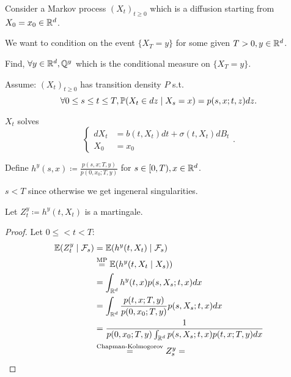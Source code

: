 Consider a Markov process $(X_t)_{t\geq 0}$ which is a 
diffusion starting from $X_0=x_0\in\mathbb{R}^d$. %

We want to condition on the event $\{X_T=y\}$ for some given $T>0,y\in\mathbb{R}^d$.

 Find, $\forall y\in \mathbb{R}^d, \mathbb{Q}^y$ which is the conditional measure on $\{X_T=y\}$.

Assume: $(X_t)_{t\geq 0}$ has transition density $P$ s.t. 
\[\forall 0\leq s\leq t\leq T,\mathbb{P}(X_t\in dz\mid X_s=x)=p(s,x;t,z)dz.\]

$X_t$ solves \[\begin{cases}dX_t &= b(t,X_t)dt+\sigma(t,X_t)dB_t\\
    X_0&=x_0
\end{cases}.\]

Define $h^y(s,x)\coloneqq \frac{p(s,x;T,y)}{p(0,x_0;T,y)}$ for $s\in [0,T),x\in\mathbb{R}^d$.

\begin{remark}
    $s<T$ since otherwise we get ingeneral singularities.
\end{remark}

\begin{lemma}\label{lem:2.4}
    Let $Z_t^y\coloneqq h^y(t,X_t)$ is a martingale. 
\end{lemma}

\begin{proof}
    Let $0\leq <t<T$:
    \begin{align*}
        \mathbb{E}(Z_t^y\mid\mathcal{F}_s)&=\mathbb{E}(h^y(t,X_t)\mid \mathcal{F}_s)\\
        &\stackrel{\text{MP}}{=}\mathbb{E}(h^y(t,X_t\mid X_s))\\
        &=\int_{\mathbb{R}^d} h^y(t,x)p(s,X_s;t,x)dx\\
        &=\int_{\mathbb{R}^d} \frac{p(t,x;T,y)}{p(0,x_0;T,y)}p(s,X_s;t,x)dx\\
        &=\frac{1}{p(0,x_0;T,y)\int_{\mathbb{R}^d}p(s,X_s;t,x)p(t,x;T,y)dx}\\
        &\stackrel{\text{Chapman-Kolmogorov}}{=} Z_s^y=
    \end{align*}
\end{proof}


